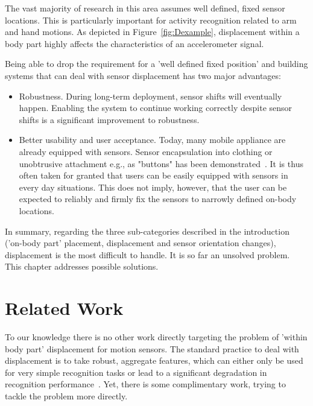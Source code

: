 The vast majority of research in this area 
assumes well defined, fixed sensor locations. This is particularly
important for activity recognition related to arm and hand motions.
As depicted in Figure~\ref{fig:Dexample}, displacement within a
body part highly affects the characteristics of an accelerometer signal.

Being able to drop the requirement for a 'well defined fixed position' and
building systems that can deal with sensor displacement has two major
advantages:

\begin{itemize}
\item Robustness. During long-term deployment, sensor
  shifts will eventually happen.  Enabling the system to continue
  working correctly despite sensor shifts is a significant
  improvement to robustness.
\item Better usability and user acceptance. Today, many mobile
  appliance are already equipped with sensors. Sensor encapsulation into
  clothing or unobtrusive attachment e.g., as "buttons"
   has been demonstrated~\cite{roggen2006smn}. It is thus often taken
  for granted that users  can be easily equipped with sensors in every day
  situations.  This does not imply, however, that the user can be 
 expected to reliably and firmly fix the sensors to narrowly defined on-body locations.
\end{itemize}

In summary, regarding the three sub-categories described in the introduction ('on-body part' placement, displacement and sensor orientation changes), displacement is the most difficult to handle. It is so far an unsolved problem. This chapter addresses possible solutions. 


\section{Related Work}

To our knowledge there is no other work directly targeting the problem of 'within body part' displacement for motion sensors. The standard practice to deal with displacement is to take robust, aggregate features, which can either only be used for very simple recognition tasks or lead to a significant degradation in recognition performance~\cite{Lester:2006p856,Krause:2003p1536,Borriello:2006p1201}. Yet, there is some complimentary work, trying to tackle the problem more directly.

